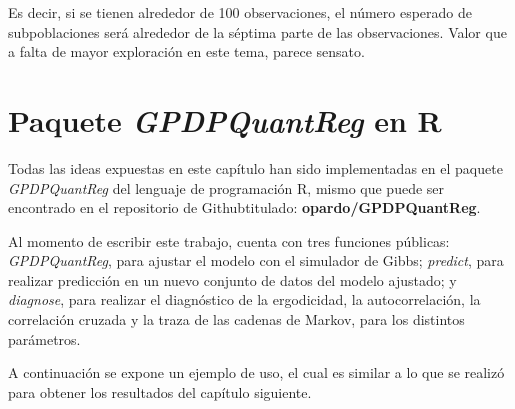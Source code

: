 Es decir, si se tienen alrededor de 100 observaciones, el n\'umero esperado de subpoblaciones ser\'a alrededor de la s\'eptima parte de las observaciones. Valor que a falta de mayor exploraci\'on en este tema, parece sensato.

\section{Paquete \textit{GPDPQuantReg} en R}

Todas las ideas expuestas en este cap\'itulo han sido implementadas en el paquete \textit{GPDPQuantReg} del lenguaje de programaci\'on R, mismo que puede ser encontrado en el repositorio de Github\faGithub \space titulado: \textbf{opardo/GPDPQuantReg}.

Al momento de escribir este trabajo, cuenta con tres funciones p\'ublicas: \textit{GPDPQuantReg}, para ajustar el modelo con el simulador de Gibbs; \textit{predict}, para realizar predicci\'on en un nuevo conjunto de datos del modelo ajustado; y \textit{diagnose}, para realizar el diagn\'ostico de la ergodicidad, la autocorrelaci\'on, la correlaci\'on cruzada y la traza de las cadenas de Markov, para los distintos par\'ametros.

A continuaci\'on se expone un ejemplo de uso, el cual es similar a lo que se realiz\'o para obtener los resultados del cap\'itulo siguiente.



\newpage